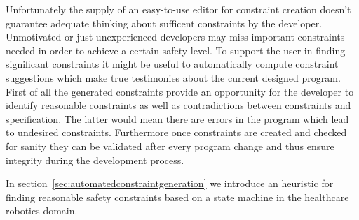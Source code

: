 \documentclass[conference]{IEEEtran}
\begin{document}
Unfortunately the supply of an easy-to-use editor for constraint creation doesn't guarantee adequate thinking about sufficent constraints by the developer. Unmotivated or just unexperienced developers may miss important constraints needed in order to achieve a certain safety level.
To support the user in finding significant constraints it might be useful to automatically compute constraint suggestions which make true testimonies about the current designed program. First of all the generated constraints provide an opportunity for the developer to identify reasonable constraints as well as contradictions between constraints and specification. The latter would mean there are errors in the program which lead to undesired constraints. Furthermore once constraints are created and checked for sanity they can be validated after every program change and thus ensure integrity during the development process.

In section~\ref{sec:automatedconstraintgeneration} we introduce an heuristic for finding reasonable safety constraints based on a state machine in the healthcare robotics domain.




\end{document}
